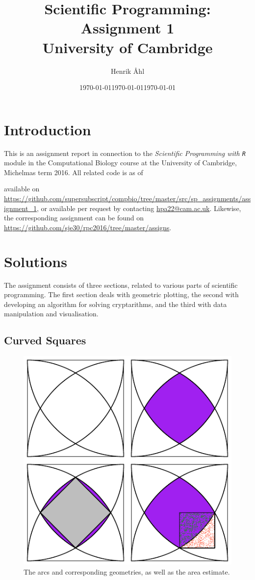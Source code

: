 \documentclass[12pt]{article}\usepackage[]{graphicx}\usepackage[]{color}
\title
{
  \phantom{a}\vspace{2cm}
	\textbf
	{
      Scientific Programming: Assignment 1
  }\\[1em]
  \small{University of Cambridge}
}
\author{Henrik Åhl}
\date{\today}
\theoremstyle{plain}
\theoremstyle{definition}
\newcommand{\R}{\texttt{R}}
\begin{document}
\date{\today}
\maketitle

\newpage
\section{Introduction}

This is an assignment report in connection to the \textit{Scientific Programming with \R} module in the Computational Biology course at the University of Cambridge, Michelmas term 2016. All related code is as of \date{\today} available on \url{https://github.com/supersubscript/compbio/tree/master/src/sp_assignments/assignment_1}, or available per request by contacting \href{mailto:hpa22@cam.ac.uk}{hpa22@cam.ac.uk}. Likewise, the corresponding assignment can be found on \url{https://github.com/sje30/rpc2016/tree/master/assigns}.


\section{Solutions}
The assignment consists of three sections, related to various parts of scientific programming. The first section deals with geometric plotting, the second with developing an algorithm for solving cryptarithms, and the third with data manipulation and visualisation. 

\subsection{Curved Squares}
\begin{figure}[H]
  \centering
  \includegraphics[scale=.7]{curved_squares.pdf}
  \caption{The arcs and corresponding geometries, as well as the area estimate.}
\end{figure}
\end{document}
